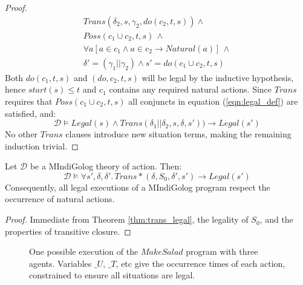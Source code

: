 \documentclass{llncs}
\begin{document}
\begin{proof}
\begin{multline*}
Trans(\delta_{2},s,\gamma_{2},do(c_{2},t,s))\wedge\\
Poss(c_{1}\cup c_{2},t,s)\,\wedge\\
\forall a\left[a\in c_{1}\wedge a\in c_{2}\rightarrow Natural(a)\right]\,\wedge\\
\delta'=(\gamma_{1}||\gamma_{2})\wedge s'=do(c_{1}\cup c_{2},t,s)
\end{multline*}
Both $do(c_1,t,s)$ and $(do,c_2,t,s)$ will be legal by the inductive hypothesis,
hence $start(s) \leq t$ and $c_1$ contains any required natural actions.
Since $Trans$ requires that $Poss(c_1 \cup c_2,t,s)$ all conjuncts in
equation (\ref{eqn:legal_def}) are satisfied, and:
\begin{equation*}
\mathcal{D} \models Legal(s) \wedge Trans(\delta_1 || \delta_2,s,\delta,s'))
\rightarrow Legal(s')
\end{equation*}
No other $Trans$ clauses introduce new situation terms, making
the remaining induction trivial.
\end{proof}

\begin{theorem}
Let $\mathcal{D}$ be a MIndiGolog theory of action. Then:
\begin{equation*}
\mathcal{D} \models \forall s',\delta,\delta'.\,Trans*(\delta,S_0,\delta',s')
\rightarrow Legal(s')
\end{equation*}
Consequently, all legal executions of a MIndiGolog program respect
the occurrence of natural actions.
\end{theorem}

\begin{proof}
Immediate from Theorem \ref{thm:trans_legal}, the legality of $S_0$, and
the properties of transitive closure.
\end{proof}

\begin{figure*}[t]
\centering
{}
\caption{One possible execution of the $MakeSalad$
program with three agents. Variables $\_ U$, $\_ T$, etc give
the occurrence times of each action, constrained to ensure all situations
are legal.}\label{cap:example_trace}
\end{figure*}
\end{document}
